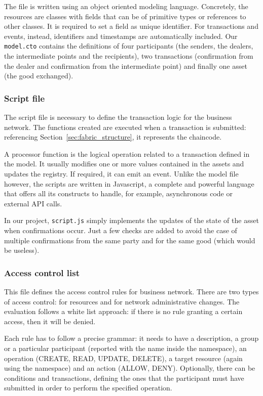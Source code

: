 The file is written using an object oriented modeling language. Concretely, the resources are classes with fields that can be of primitive types or references to other classes. It is required to set a field as unique identifier. For transactions and events, instead, identifiers and timestamps are automatically included. Our \texttt{model.cto} contains the definitions of four participants (the senders, the dealers, the intermediate points and the recipients), two transactions (confirmation from the dealer and confirmation from the intermediate point) and finally one asset (the good exchanged).

\subsubsection{Script file}
The script file is necessary to define the transaction logic for the business network. The functions created are executed when a transaction is submitted: referencing Section~\ref{sec:fabric_structure}, it represents the chaincode.

A processor function is the logical operation related to a transaction defined in the model. It usually modifies one or more values contained in the assets and updates the registry. If required, it can emit an event. Unlike the model file however, the scripts are written in Javascript, a complete and powerful language that offers all its constructs to handle, for example, asynchronous code or external API calls.

In our project, \texttt{script.js} simply implements the updates of the state of the asset when confirmations occur. Just a few checks are added to avoid the case of multiple confirmations from the same party and for the same good (which would be useless).

\subsubsection{Access control list}
This file defines the access control rules for business network. There are two types of access control: for resources and for network administrative changes. The evaluation follows a white list approach: if there is no rule granting a certain access, then it will be denied.

Each rule has to follow a precise grammar: it needs to have a description, a group or a particular participant (reported with the name inside the namespace), an operation (CREATE, READ, UPDATE, DELETE), a target resource (again using the namespace) and an action (ALLOW, DENY). Optionally, there can be conditions and transactions, defining the ones that the participant must have submitted in order to perform the specified operation.

